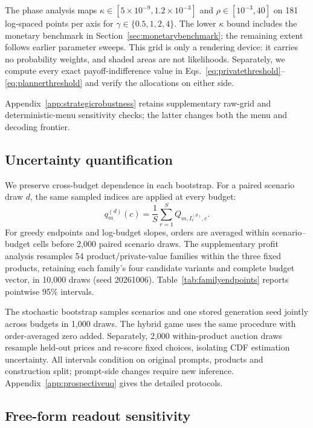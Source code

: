 \documentclass{article}
\begin{document}
The phase analysis maps $\kappa\in[5\times10^{-9},1.2\times10^{-3}]$ and $\rho\in[10^{-3},40]$ on 181 log-spaced points per axis for $\gamma\in\{0.5,1,2,4\}$. The lower $\kappa$ bound includes the monetary benchmark in Section~\ref{sec:monetarybenchmark}; the remaining extent follows earlier parameter sweeps. This grid is only a rendering device: it carries no probability weights, and shaded areas are not likelihoods. Separately, we compute every exact payoff-indifference value in Eqs.~\eqref{eq:privatethreshold}--\eqref{eq:plannerthreshold} and verify the allocations on either side.

Appendix~\ref{app:strategicrobustness} retains supplementary raw-grid and deterministic-menu sensitivity checks; the latter changes both the menu and decoding frontier.

\subsection{Uncertainty quantification}
\label{sec:uncertainty}

We preserve cross-budget dependence in each bootstrap. For a paired scenario draw $d$, the same sampled indices are applied at every budget:
\begin{equation}
 q_m^{(d)}(c)=\frac{1}{S}\sum_{r=1}^{S}Q_{m,I_r^{(d)},c}.
 \label{eq:bootstrapfrontier}
\end{equation}
For greedy endpoints and log-budget slopes, orders are averaged within scenario--budget cells before 2,000 paired scenario draws. The supplementary profit analysis resamples 54 product/private-value families within the three fixed products, retaining each family's four candidate variants and complete budget vector, in 10,000 draws (seed 20261006). Table~\ref{tab:familyendpoints} reports pointwise 95\% intervals.

The stochastic bootstrap samples scenarios and one stored generation seed jointly across budgets in 1,000 draws. The hybrid game uses the same procedure with order-averaged zero added. Separately, 2,000 within-product auction draws resample held-out prices and re-score fixed choices, isolating CDF estimation uncertainty. All intervals condition on original prompts, products and construction split; prompt-side changes require new inference. Appendix~\ref{app:prospectiveuq} gives the detailed protocols.

\subsection{Free-form readout sensitivity}
\label{sec:freeformmethod}
\end{document}
